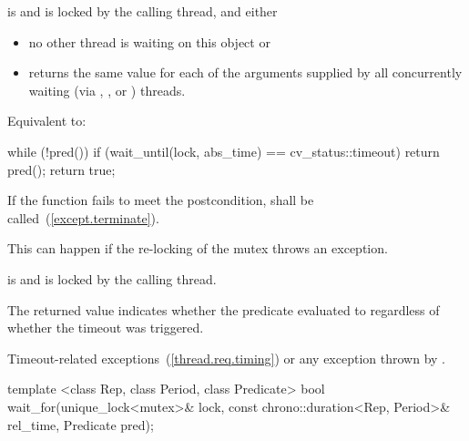 \begin{itemdescr}
\pnum
\requires {} is  and  is
locked by the calling thread, and either

\begin{itemize}
\item no other thread is waiting on this  object or
\item {} returns the same value for each of the 
arguments supplied by all concurrently waiting (via ,
, or ) threads.
\end{itemize}

\pnum
\effects Equivalent to:
\begin{codeblock}
while (!pred())
  if (wait_until(lock, abs_time) == cv_status::timeout)
    return pred();
return true;
\end{codeblock}

\pnum
\remarks
If the function fails to meet the postcondition, 
shall be called~(\ref{except.terminate}).
\begin{note} This can happen if the re-locking of the mutex throws an exception. \end{note}

\pnum
\postcondition {} is  and 
is locked by the calling thread.

\pnum
\begin{note} The returned value indicates whether the predicate evaluated to
 regardless of whether the timeout was triggered. \end{note}

\pnum
\throws Timeout-related
exceptions~(\ref{thread.req.timing}) or any exception thrown by .

\end{itemdescr}

%
%
\begin{itemdecl}
template <class Rep, class Period, class Predicate>
  bool wait_for(unique_lock<mutex>& lock,
                const chrono::duration<Rep, Period>& rel_time,
                Predicate pred);
\end{itemdecl}

